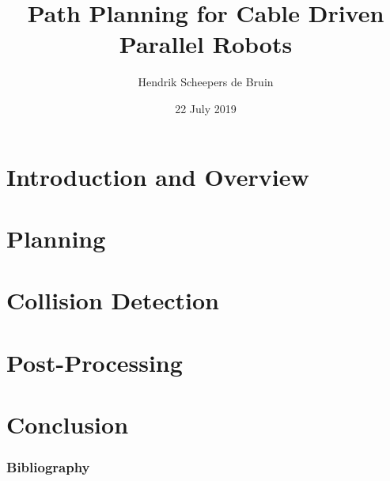 \documentclass{beamer}
\title{Path Planning for Cable Driven Parallel Robots}
\author{Hendrik Scheepers de Bruin}
\institute{École Centrale de Nantes, Università degli Studi di Genova}
\date{22 July 2019}
\begin{document}
	\frame{\titlepage}
	\section{Introduction and Overview}
		
	\section{Planning}
		
	\section{Collision Detection}
		
	\section{Post-Processing}
		
	\section{Conclusion}
		

	\begin{frame}
		\frametitle{Bibliography}
		\printbibliography{}
	\end{frame}
\end{document}
